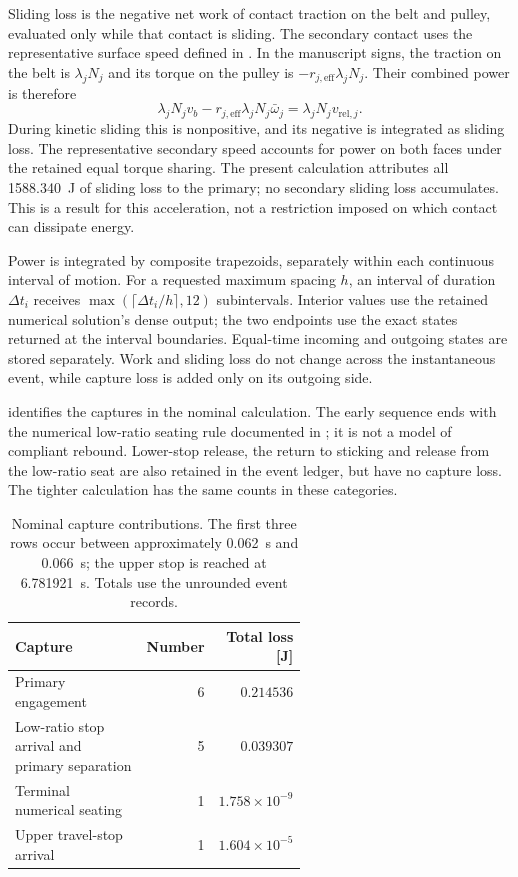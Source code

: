 \documentclass[11pt]{report}
\numberwithin{equation}{section}
\begin{document}
Sliding loss is the negative net work of contact traction on the belt and
pulley, evaluated only while that contact is sliding. The secondary contact
uses the representative surface speed defined in
. In the manuscript signs, the
traction on the belt is $\lambda_jN_j$ and its torque on the pulley is
$-r_{j,\mathrm{eff}}\lambda_jN_j$. Their combined power is therefore
\[
  \lambda_jN_jv_b-r_{j,\mathrm{eff}}\lambda_jN_j\bar\omega_j
  =\lambda_jN_jv_{\mathrm{rel},j}.
\]
During kinetic sliding this is nonpositive, and its negative is integrated
as sliding loss. The representative secondary speed accounts for power on
both faces under the retained equal torque sharing. The present calculation
attributes all \SI{1588.340}{J} of sliding loss to the primary; no secondary
sliding loss accumulates. This is a result for this acceleration, not a
restriction imposed on which contact can dissipate energy.

Power is integrated by composite trapezoids, separately within each
continuous interval of motion. For a requested maximum spacing \(h\), an
interval of duration \(\Delta t_i\) receives
\(\max(\lceil\Delta t_i/h\rceil,12)\) subintervals. Interior values use
the retained numerical solution's dense output; the two endpoints use the
exact states returned at the interval boundaries. Equal-time incoming and
outgoing states are stored separately. Work and sliding loss do not change
across the instantaneous event, while capture loss is added only on its
outgoing side.

 identifies the captures in the nominal
calculation. The early sequence ends with the numerical low-ratio seating
rule documented in ; it is not a model
of compliant rebound. Lower-stop release, the return to sticking and
release from the low-ratio seat are also retained in the event ledger,
but have no capture loss. The tighter calculation has the same counts
in these categories.

\begin{table}[H]
  \centering\small
  \begin{tabular}{@{}p{0.58\linewidth}rr@{}}
    \toprule
    Capture & Number & Total loss [J] \\
    \midrule
    Primary engagement & 6 & \(0.214536\) \\
    Low-ratio stop arrival and primary separation & 5 & \(0.039307\) \\
    Terminal numerical seating & 1 & \(1.758\times10^{-9}\) \\
    Upper travel-stop arrival & 1 & \(1.604\times10^{-5}\) \\
    \bottomrule
  \end{tabular}
  \caption{Nominal capture contributions. The first three rows occur between
  approximately \SI{0.062}{s} and \SI{0.066}{s}; the upper stop is reached at
  \SI{6.781921}{s}. Totals use the unrounded event records.}
  \label{tab:energy_capture_inventory}
\end{table}
\end{document}

